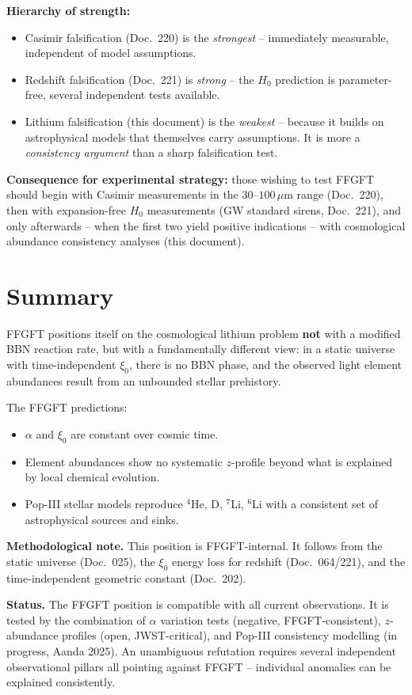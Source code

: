 \textbf{Hierarchy of strength:}
\begin{itemize}[leftmargin=2em,itemsep=2pt,topsep=2pt]
  \item Casimir falsification (Doc.~220) is the \emph{strongest} --
        immediately measurable, independent of model assumptions.
  \item Redshift falsification (Doc.~221) is \emph{strong} -- the
        $H_0$ prediction is parameter-free, several independent
        tests available.
  \item Lithium falsification (this document) is the \emph{weakest}
        -- because it builds on astrophysical models that themselves
        carry assumptions. It is more a \emph{consistency argument}
        than a sharp falsification test.
\end{itemize}

\textbf{Consequence for experimental strategy:} those wishing to
test FFGFT should begin with Casimir measurements in the
$30$--$100\,\mu$m range (Doc.~220), then with expansion-free $H_0$
measurements (GW standard sirens, Doc.~221), and only afterwards --
when the first two yield positive indications -- with cosmological
abundance consistency analyses (this document).

\section{Summary}

FFGFT positions itself on the cosmological lithium problem
\textbf{not} with a modified BBN reaction rate, but with a
fundamentally different view: in a static universe with
time-independent $\xi_0$, there is no BBN phase, and the observed
light element abundances result from an unbounded stellar
prehistory.

The FFGFT predictions:
\begin{itemize}[leftmargin=2em,itemsep=2pt,topsep=2pt]
  \item $\alpha$ and $\xi_0$ are constant over cosmic time.
  \item Element abundances show no systematic $z$-profile beyond
        what is explained by local chemical evolution.
  \item Pop-III stellar models reproduce $^4$He, D, $^7$Li, $^6$Li
        with a consistent set of astrophysical sources and sinks.
\end{itemize}

\textbf{Methodological note.} This position is FFGFT-internal. It
follows from the static universe (Doc.~025), the $\xi_0$ energy loss
for redshift (Doc.~064/221), and the time-independent geometric
constant (Doc.~202).

\textbf{Status.} The FFGFT position is compatible with all current
observations. It is tested by the combination of $\alpha$ variation
tests (negative, FFGFT-consistent), $z$-abundance profiles (open,
JWST-critical), and Pop-III consistency modelling (in progress,
Aanda 2025). An unambiguous refutation requires several independent
observational pillars all pointing against FFGFT -- individual
anomalies can be explained consistently.
